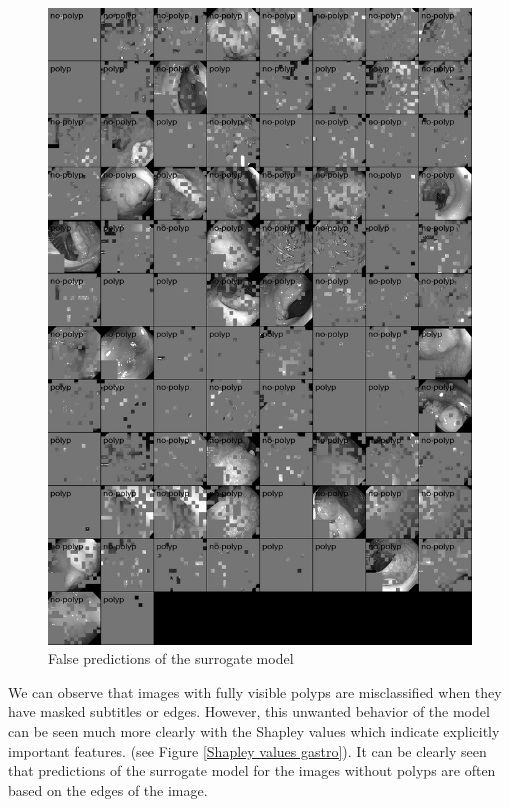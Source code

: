 \documentclass[magisterska,en]{pracamgr}
\begin{document}
\begin{figure}[H]
\centering
\includegraphics[scale=0.4]{./images/gastro_false_surrogate.png}
\caption{False predictions of the surrogate model}
\label{gastro_vit_masked}
\end{figure}


We can observe that images with fully visible polyps are misclassified when they have masked subtitles or edges. 
However, this unwanted behavior of the model can be seen much more clearly with the Shapley values which indicate explicitly important features. 
(see Figure \ref{Shapley values gastro}). It can be clearly seen that predictions of the surrogate model for the images without polyps are often based on the edges of the image. 
\end{document}
